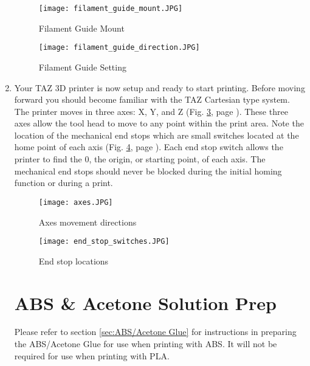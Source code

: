 \begin{enumerate}
\begin{figure}[H]
\centering
\texttt{[image: filament\_guide\_mount.JPG]}
\caption{Filament Guide Mount}
\label{fig:filament_guide_mount}
\end{figure}

\begin{figure}[H]
\centering
\texttt{[image: filament\_guide\_direction.JPG]}
\caption{Filament Guide Setting}
\label{fig:filament_guide_setting}
\end{figure}

\item Your TAZ 3D printer is now setup and ready to start printing. Before moving forward you should become familiar with the TAZ Cartesian type system. The printer moves in three axes: X, Y, and Z (Fig. \ref{fig:axes}, page \pageref{fig:axes}). These three axes allow the tool head to move to any point within the print area. Note the location of the mechanical end stops which are small switches located at the home point of each axis (Fig. \ref{fig:endstops}, page \pageref{fig:endstops}). Each end stop switch allows the printer to find the 0, the origin, or starting point, of each axis. The mechanical end stops should never be blocked during the initial homing function or during a print.
\begin{figure}[H]
\centering
\texttt{[image: axes.JPG]}
\caption{Axes movement directions}
\label{fig:axes}
\end{figure}

\begin{figure}[hp]
\centering
\texttt{[image: end\_stop\_switches.JPG]}
\caption{End stop locations}
\label{fig:endstops}
\end{figure}


\section{ABS \& Acetone Solution Prep}
Please refer to section \ref{sec:ABS/Acetone Glue} for instructions in preparing the ABS/Acetone Glue for use when printing with ABS. It will not be required for use when printing with PLA.


\end{enumerate}
